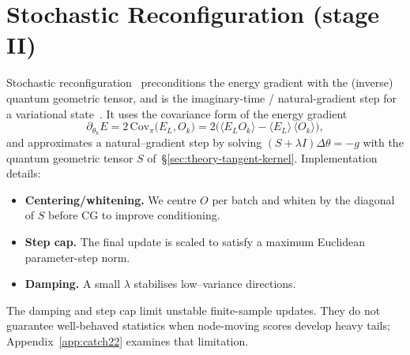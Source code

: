 \section{Stochastic Reconfiguration (stage II)}
\label{sec:sr-stage}

Stochastic reconfiguration~\cite{Sorella1998-SR,BeccaSorella2017-QMCBook} preconditions the
energy gradient with the (inverse) quantum geometric tensor, and is the imaginary-time /
natural-gradient step for a variational state~\cite{Amari1998-NaturalGradient,StokesEtAl2020-QuantumNaturalGradient}.
It uses the covariance form of the energy gradient
\begin{equation}
\partial_{\theta_k}E
= 2\,\mathrm{Cov}_\pi\!\big(E_L, O_k\big)
= 2\Big(\langle E_L O_k\rangle - \langle E_L\rangle\,\langle O_k\rangle\Big),
\end{equation}
and approximates a natural–gradient step by solving $(S+\lambda I)\Delta\theta=-g$ with the
quantum geometric tensor $S$ of~\S\ref{sec:theory-tangent-kernel}.
Implementation details:
\begin{itemize}
  \item \textbf{Centering/whitening.} We centre $O$ per batch and whiten by the diagonal of $S$ before CG to improve conditioning.
  \item \textbf{Step cap.} The final update is scaled to satisfy a maximum Euclidean parameter-step norm.
  \item \textbf{Damping.} A small $\lambda$ stabilises low--variance directions.
\end{itemize}
The damping and step cap limit unstable finite-sample updates. They do not guarantee
well-behaved statistics when node-moving scores develop heavy tails; Appendix~\ref{app:catch22}
examines that limitation.

